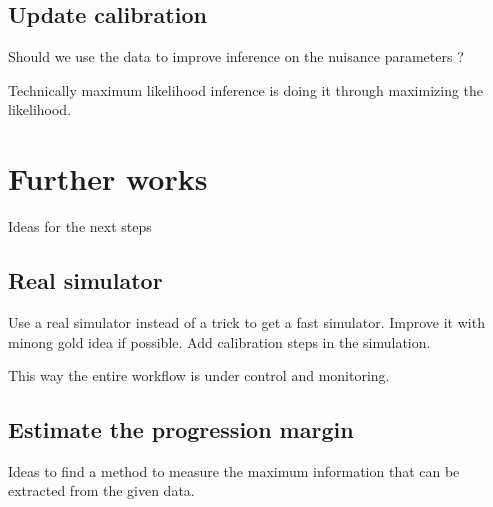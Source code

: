 \subsection{Update calibration} %
\label{sub:update_calibration}

Should we use the data to improve inference on the nuisance parameters ?

Technically maximum likelihood inference is doing it through maximizing the likelihood.


\section{Further works} %
\label{sec:further_works}

Ideas for the next steps

\subsection{Real simulator} %
\label{sub:real_simulator}

Use a real simulator instead of a trick to get a fast simulator.
Improve it with minong gold idea if possible.
Add calibration steps in the simulation.

This way the entire workflow is under control and monitoring.



\subsection{Estimate the progression margin} %
\label{sub:estimate_the_progression_margin}

Ideas to find a method to measure the maximum information that can be extracted from the given data.






